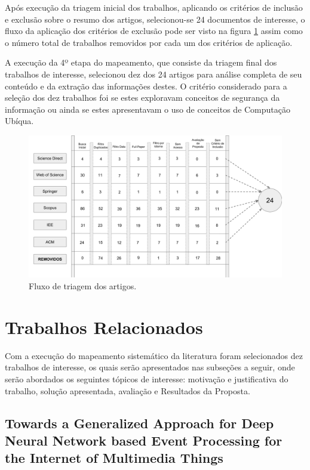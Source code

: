 \documentclass[ti,table]{texufpel} %
\begin{document}
Após execução da triagem inicial dos trabalhos, aplicando os critérios de inclusão e exclusão sobre o resumo dos artigos, selecionou-se 24 documentos de interesse, o fluxo da aplicação dos critérios de exclusão pode ser visto na figura \ref{fig:grafFluxoTriagemInicial} assim como o número total de trabalhos removidos por cada um dos critérios de aplicação. 

A execução da 4º etapa do mapeamento, que consiste da triagem final dos trabalhos de interesse, selecionou dez dos 24 artigos para análise completa de seu conteúdo e da extração das informações destes. O critério considerado para a seleção dos dez trabalhos foi se estes exploravam conceitos de segurança da informação ou ainda se estes apresentavam o uso de conceitos de Computação Ubíqua. 


\begin{landscape}
\begin{figure}[ht]
	\centering
	\includegraphics[width=1.7\textwidth]{imagens/FluxoTriagemInicial.png}
	\caption{Fluxo de triagem dos artigos.}
	\label{fig:grafFluxoTriagemInicial}
\end{figure}
\end{landscape}


\section{Trabalhos Relacionados}
Com a execução do mapeamento sistemático da literatura
foram selecionados dez trabalhos de interesse, os quais serão apresentados nas subseções a seguir, onde serão abordados os seguintes tópicos de interesse: motivação e justificativa do trabalho, solução apresentada, avaliação e Resultados da Proposta.


\subsection{Towards a Generalized Approach for Deep Neural Network based Event Processing for the Internet of Multimedia Things}
\end{document}
